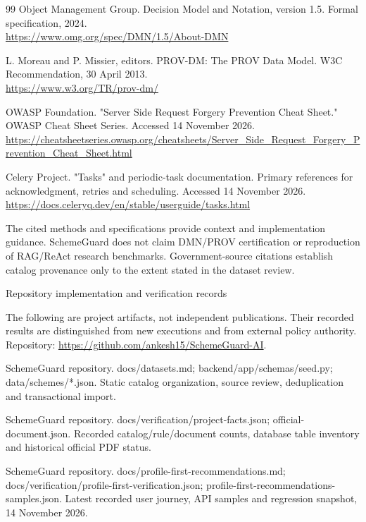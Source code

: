 \documentclass[12pt,a4paper,twoside]{report}
\begin{document}
\begin{thebibliography}{99}
Object Management Group. Decision Model and Notation, version 1.5. Formal specification, 2024.\\\url{https://www.omg.org/spec/DMN/1.5/About-DMN}

L. Moreau and P. Missier, editors. PROV-DM: The PROV Data Model. W3C Recommendation, 30 April 2013.\\\url{https://www.w3.org/TR/prov-dm/}

OWASP Foundation. "Server Side Request Forgery Prevention Cheat Sheet." OWASP Cheat Sheet Series. Accessed 14 November 2026.\\\url{https://cheatsheetseries.owasp.org/cheatsheets/Server_Side_Request_Forgery_Prevention_Cheat_Sheet.html}

Celery Project. "Tasks" and periodic-task documentation. Primary references for acknowledgment, retries and scheduling. Accessed 14 November 2026.\\\url{https://docs.celeryq.dev/en/stable/userguide/tasks.html}

{\small The cited methods and specifications provide context and implementation guidance. SchemeGuard does not claim DMN/PROV certification or reproduction of RAG/ReAct research benchmarks. Government-source citations establish catalog provenance only to the extent stated in the dataset review.}

Repository implementation and verification records

{\small The following are project artifacts, not independent publications. Their recorded results are distinguished from new executions and from external policy authority. Repository: \url{https://github.com/ankesh15/SchemeGuard-AI}.}

SchemeGuard repository. docs/datasets.md; backend/app/schemas/seed.py; data/schemes/*.json. Static catalog organization, source review, deduplication and transactional import.

SchemeGuard repository. docs/verification/project-facts.json; official-document.json. Recorded catalog/rule/document counts, database table inventory and historical official PDF status.

SchemeGuard repository. docs/profile-first-recommendations.md; docs/verification/profile-first-verification.json; profile-first-recommendations-samples.json. Latest recorded user journey, API samples and regression snapshot, 14 November 2026.


\end{thebibliography}
\end{document}
